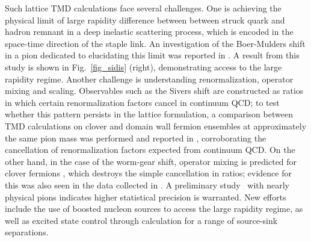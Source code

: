 Such lattice TMD calculations face several challenges. One is achieving
the physical limit of large rapidity difference between between struck
quark and hadron remnant in a deep inelastic scattering process, which
is encoded in the space-time direction of the staple link. An investigation
of the Boer-Mulders shift in a pion dedicated to elucidating this limit
was reported in \cite{Engelhardt:2015xja}. A result from this study is
shown in Fig.~\ref{fig_sidis} (right), demonstrating access to the large
rapidity regime. Another challenge is understanding renormalization,
operator mixing and scaling. Observables such as the Sivers shift are
constructed as ratios in which certain renormalization factors cancel
in continuum QCD; to test whether this pattern persists in the lattice
formulation, a comparison between TMD calculations on clover and domain
wall fermion ensembles at approximately the same pion mass was performed
and reported in \cite{Yoon:2017qzo}, corroborating the cancellation of 
renormalization factors expected from continuum QCD.
On the other hand,
in the case of the worm-gear shift, operator mixing is predicted for
clover fermions \cite{Constantinou:2017sej}, which destroys the simple
cancellation in ratios; evidence for this was also seen in the data
collected in \cite{Yoon:2017qzo}.
A preliminary study~\cite{Engelhardt:2015czw} with nearly physical
pions indicates higher statistical precision is warranted. New efforts
include the use of boosted nucleon sources to access the large
rapidity regime, as well as excited state control through calculation
for a range of source-sink separations.

%

